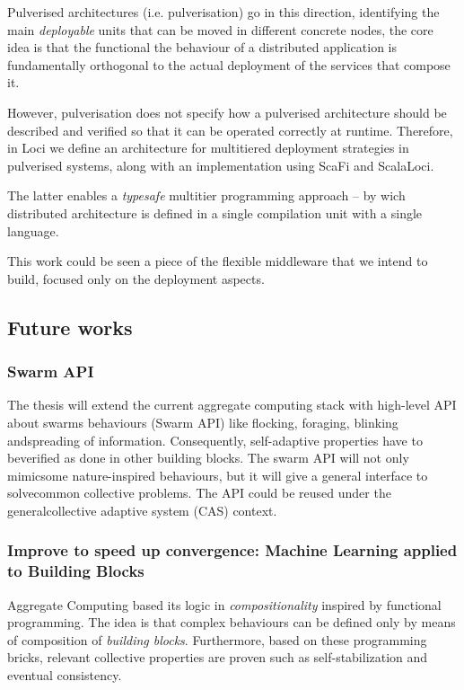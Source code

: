 \documentclass[11pt]{article}
\begin{document}
Pulverised architectures (i.e. pulverisation) go in this direction, identifying the main \textit{deployable} units that can be moved in different concrete nodes, the core idea is that the functional
the behaviour of a distributed application is fundamentally orthogonal to the actual deployment of the services that compose it.

However, pulverisation does not specify how a pulverised architecture should
be described and verified so that it can be operated correctly
at runtime.
Therefore, in \scafiweb Loci we define an architecture for multitiered deployment strategies in pulverised systems, along with an implementation using ScaFi and ScalaLoci.

The latter enables a \textit{typesafe} multitier programming approach -- by wich distributed architecture is defined
in a single compilation unit with a single language.

This work could be seen a piece of the flexible middleware that we intend to build, focused only on the deployment aspects.

\subsection{Future works}

\subsubsection{Swarm API}
The thesis will extend the current aggregate computing stack with high-level API about swarms behaviours (Swarm API) like flocking, foraging, blinking andspreading of information.  Consequently, self-adaptive properties have to beverified as done in other building blocks.  The swarm API will not only mimicsome nature-inspired behaviours, but it will give a general interface to solvecommon collective  problems. The  API  could  be  reused  under  the  generalcollective adaptive system (CAS) context.
\subsubsection{Improve to speed up convergence: Machine Learning applied to Building Blocks}
Aggregate Computing based its logic in \textit{compositionality} inspired by functional programming. The idea is that complex behaviours can be defined only by means of composition of \emph{building blocks}. Furthermore, based on these programming bricks, relevant collective properties are proven such as self-stabilization and eventual consistency. 
\end{document}
